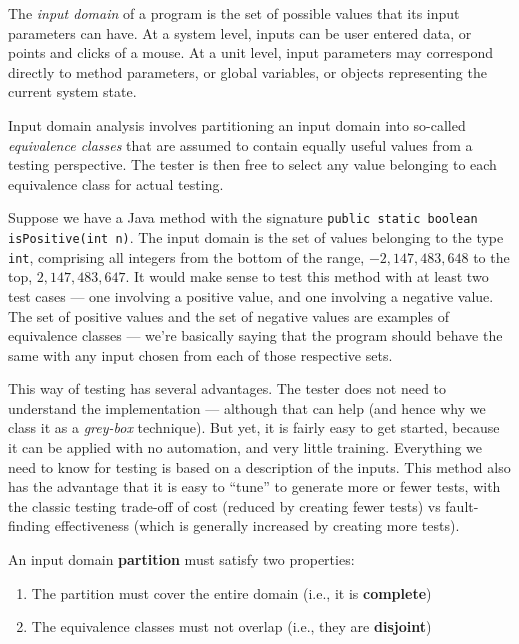 The {\it input domain} of a program is the set of possible values that its input
parameters can have. At a system level, inputs can be user entered data, or
points and clicks of a mouse. At a unit level, input parameters may correspond
directly to method parameters, or global variables, or objects representing the
current system state. 

Input domain analysis involves partitioning an input domain into so-called {\it
equivalence classes} that are assumed to contain equally useful values from a
testing perspective. The tester is then free to select any value belonging to
each equivalence class for actual testing. 

Suppose we have a Java method with the signature {\tt public static boolean
isPositive(int n)}. The input domain is the set of values belonging to the type
{\tt int}, comprising all integers from the bottom of the range, $-2,147,483,648$
to the top, $2,147,483,647$. It would make sense to test this method with at
least two test cases --- one involving a positive value, and one involving a
negative value. 
%
The set of positive values and the set of negative values are examples of
equivalence classes --- we're basically saying that the program should behave
the same with any input chosen from each of those respective sets.

This way of testing has several advantages. The tester does not need to
understand the implementation --- although that can help (and hence why we class
it as a {\it grey-box} technique). But yet, it is fairly easy to get started,
because it can be applied with no automation, and very little training.
Everything we need to know for testing is based on a description of the inputs.
This method also has the advantage that it is easy to ``tune'' to generate more
or fewer tests, with the classic testing trade-off of cost (reduced by creating
fewer tests) vs fault-finding effectiveness (which is generally increased by
creating more tests).

An input domain {\bf partition} must satisfy two properties:

\begin{enumerate}
    \item The partition must cover the entire domain (i.e., it is {\bf complete}) 
    \item The equivalence classes must not overlap (i.e., they are {\bf disjoint})
\end{enumerate}

